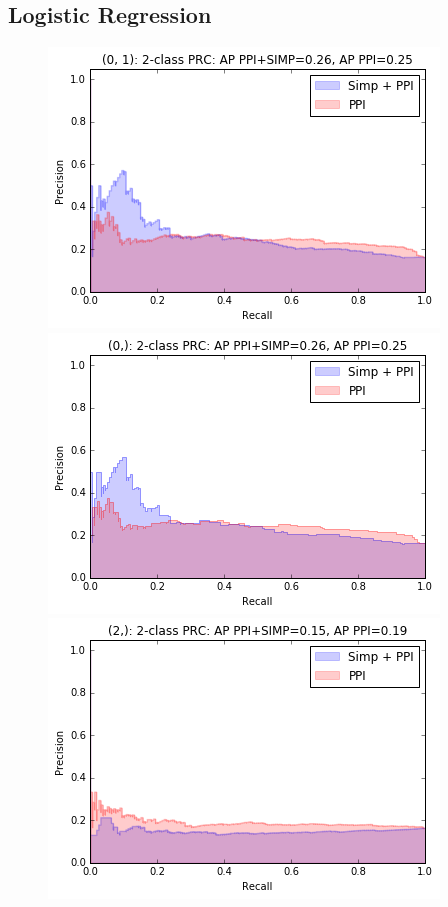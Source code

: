 \documentclass[9pt]{article}
\begin{document}
\subsection{Logistic Regression}
\begin{figure}[!htb]
  \includegraphics[width=\linewidth]{logisticRegressionGraphs/logr1.png}
\endminipage\hfill
{}
  \includegraphics[width=\linewidth]{logisticRegressionGraphs/logr3.png}
\endminipage\hfill
{}%
  \includegraphics[width=\linewidth]{logisticRegressionGraphs/logr6.png}

\end{figure}
\end{document}
